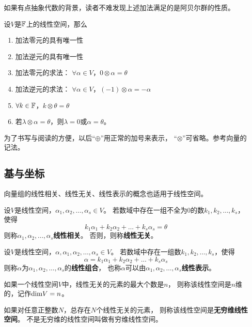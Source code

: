 \begin{remark}
  如果有点抽象代数的背景，读者不难发现上述加法满足的是阿贝尔群的性质。
\end{remark}

\begin{theorem}[线性空间的性质]
  设$V$是$\mathbb{F}$上的线性空间，那么
  \begin{enumerate}
    \item 加法零元的具有唯一性
    \item 加法逆元的具有唯一性
    \item 加法零元的求法：
    $\forall\alpha\in V$，$0\otimes\alpha=\theta$
    \item 加法逆元的求法：
    $\forall\alpha\in V$，$(-1)\otimes\alpha=-\alpha$
    \item $\forall k\in\mathbb{F}$，$k\otimes\theta=\theta$
    \item 若$\lambda\otimes\alpha=\theta$，则$\lambda=0$或$\alpha=\theta$。
  \end{enumerate}
\end{theorem}
为了书写与阅读的方便，以后``$\oplus$''用正常的加号来表示，
``$\otimes$''可省略。参考向量的记法。

\subsection{基与坐标}
向量组的线性相关、线性无关、线性表示的概念也适用于线性空间。

\begin{definition}[线性相关与线性无关]
  设$V$是线性空间，$\alpha_1,\alpha_2,\dots,\alpha_s\in V$。
  若数域中存在一组不全为0的数$k_1,k_2,\dots,k_s$，使得
  \[ k_1\alpha_1 + k_2\alpha_2 + \dots + k_s\alpha_s = \theta \]
  则称$\alpha_1,\alpha_2,\dots,\alpha_s$\textbf{线性相关}。
  否则，则称\textbf{线性无关}。
\end{definition}

\begin{definition}[线性表示]
  设$V$是线性空间，$\alpha,\alpha_1,\alpha_2,\dots,\alpha_s\in V$。
  若数域中存在一组数$k_1,k_2,\dots,k_s$，使得
  \[ \alpha = k_1\alpha_1 + k_2\alpha_2 + \dots + k_s\alpha_s \]
  则称$\alpha$为$\alpha_1,\alpha_2,\dots,\alpha_s$的\textbf{线性组合}，
  也称$\alpha$可以由$\alpha_1,\alpha_2,\dots,\alpha_s$\textbf{线性表示}。
\end{definition}

\begin{definition}[维数]
  如果一个线性空间$V$中，线性无关的元素的最大个数是$n$，
  则称该线性空间是$n$维的，记作$\textrm{dim} V = n$。

  如果对任意正整数$N$，总存在$N$个线性无关的元素，
  则称该线性空间是\textbf{无穷维线性空间}。
  不是无穷维的线性空间叫做有穷维线性空间。
\end{definition}

